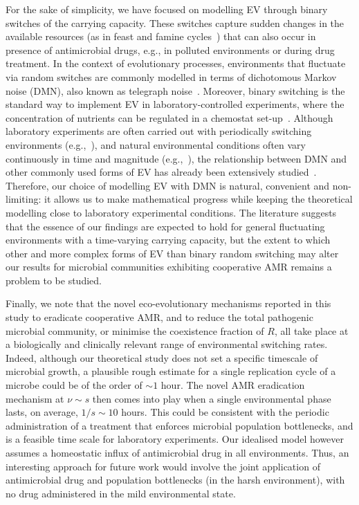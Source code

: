 \documentclass{article}
\begin{document}
For the sake of simplicity, we have focused on modelling EV through binary switches of the carrying capacity. These switches capture sudden changes in the available resources (as in feast and famine cycles~\cite{Srinivasan98, bernhardt2018metabolic, Merritt18, Himeoka19}) that can also occur in presence of antimicrobial drugs, e.g., in polluted environments or during drug treatment. In the context of evolutionary processes,  environments that fluctuate via random switches are commonly  modelled in terms of dichotomous Markov noise (DMN), also known as telegraph noise~\cite{thattai2004stochastic, Bena2006, HL06, hufton2016intrinsic, hidalgo2017species, wienand2017evolution, marrec2020resist, west2020, taitelbaum2020population, Shibasaki2021, taitelbaum2023evolutionary}. Moreover, binary switching is the standard way to implement EV in laboratory-controlled experiments, where the concentration of nutrients can be regulated in a chemostat set-up~\cite{acar2008,Lambert2014,abdul2021fluctuating, nguyen2021}. Although laboratory experiments are often carried out with periodically switching environments (e.g.,~\cite{acar2008,Lambert2014}), and natural environmental conditions often vary continuously in time and magnitude (e.g.,~\cite{nguyen2021}), the relationship between DMN and other commonly used forms of EV has already been extensively studied~\cite{Bena2006, HL06, taitelbaum2023evolutionary}. Therefore, our choice of modelling EV with DMN is natural, convenient and non-limiting: it allows us to make mathematical progress while keeping the theoretical modelling close to laboratory experimental conditions. The literature suggests that the essence of our findings are expected to hold for general fluctuating environments with a time-varying carrying capacity, but the extent to which other and more complex forms of EV than binary random switching may alter our results for microbial communities exhibiting cooperative AMR remains a problem to be studied.

Finally, we note that the novel eco-evolutionary mechanisms reported in this study to eradicate cooperative AMR, and to reduce the total pathogenic microbial community, or minimise the coexistence fraction of $R$, all take place at a biologically and clinically relevant range of environmental switching rates. Indeed, although our theoretical study does not set a specific timescale of microbial growth, a plausible rough estimate for a single replication cycle of a microbe could be of the order of \(\sim1\) hour. The novel AMR eradication mechanism at \(\nu\sim s\) then comes into play when a single environmental phase lasts, on average, \(1/s\sim 10\) hours. This could be consistent with the periodic administration of a treatment that enforces microbial population bottlenecks, and is a feasible time scale for laboratory experiments. Our idealised model however assumes a homeostatic influx of antimicrobial drug in all environments. Thus, an interesting approach for future work would involve the joint application of antimicrobial drug and population bottlenecks (in the harsh environment), with no drug administered in the mild environmental state.
\end{document}
